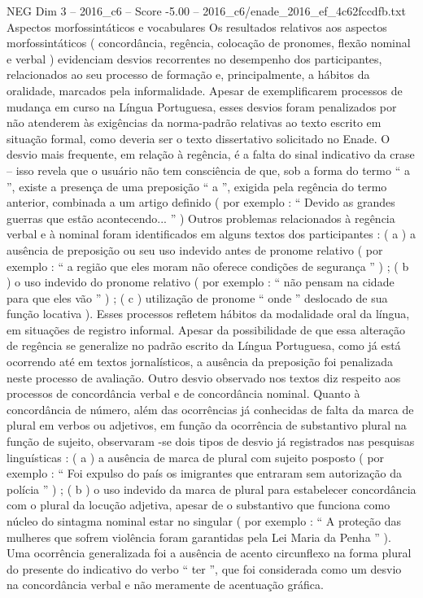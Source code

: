 \begin{textsample}{NEG Dim 3 – 2016\_c6 – Score -5.00 – 2016\_c6/enade\_2016\_ef\_4c62fccdfb.txt}
Aspectos morfossintáticos e vocabulares Os resultados relativos aos aspectos morfossintáticos ( concordância, regência, colocação de pronomes, flexão nominal e verbal ) evidenciam desvios recorrentes no desempenho dos participantes, relacionados ao seu processo de formação e, principalmente, a hábitos da oralidade, marcados pela informalidade.
Apesar de exemplificarem processos de mudança em curso na Língua Portuguesa, esses desvios foram penalizados por não atenderem às exigências da norma-padrão relativas ao texto escrito em situação formal, como deveria ser o texto dissertativo solicitado no Enade.
O desvio mais frequente, em relação à regência, é a falta do sinal indicativo da crase – isso revela que o usuário não tem consciência de que, sob a forma do termo “ a ”, existe a presença de uma preposição “ a ”, exigida pela regência do termo anterior, combinada a um artigo definido ( por exemplo : “ Devido as grandes guerras que estão acontecendo... ” ) Outros problemas relacionados à regência verbal e à nominal foram identificados em alguns textos dos participantes : ( a ) a ausência de preposição ou seu uso indevido antes de pronome relativo ( por exemplo : “ a região que eles moram não oferece condições de segurança ” ) ; ( b ) o uso indevido do pronome relativo ( por exemplo : “ não pensam na cidade para que eles vão ” ) ; ( c ) utilização de pronome “ onde ” deslocado de sua função locativa ).
Esses processos refletem hábitos da modalidade oral da língua, em situações de registro informal.
Apesar da possibilidade de que essa alteração de regência se generalize no padrão escrito da Língua Portuguesa, como já está ocorrendo até em textos jornalísticos, a ausência da preposição foi penalizada neste processo de avaliação.
Outro desvio observado nos textos diz respeito aos processos de concordância verbal e de concordância nominal.
Quanto à concordância de número, além das ocorrências já conhecidas de falta da marca de plural em verbos ou adjetivos, em função da ocorrência de substantivo plural na função de sujeito, observaram -se dois tipos de desvio já registrados nas pesquisas linguísticas : ( a ) a ausência de marca de plural com sujeito posposto ( por exemplo : “ Foi expulso do país os imigrantes que entraram sem autorização da polícia ” ) ; ( b ) o uso indevido da marca de plural para estabelecer concordância com o plural da locução adjetiva, apesar de o substantivo que funciona como núcleo do sintagma nominal estar no singular ( por exemplo : “ A proteção das mulheres que sofrem violência foram garantidas pela Lei Maria da Penha ” ).
Uma ocorrência generalizada foi a ausência de acento circunflexo na forma plural do presente do indicativo do verbo “ ter ”, que foi considerada como um desvio na concordância verbal e não meramente de acentuação gráfica.

\end{textsample}
